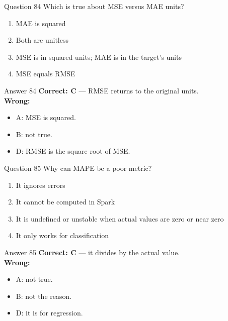 \documentclass[aspectratio=169,11pt]{beamer}
\begin{document}
\begin{frame}{Question 84}
Which is true about MSE versus MAE units?
\begin{enumerate}[label=\Alph*.]
\item MAE is squared
\item Both are unitless
\item MSE is in squared units; MAE is in the target's units
\item MSE equals RMSE
\end{enumerate}
\end{frame}
\begin{frame}{Answer 84}
\textbf{Correct: C} --- RMSE returns to the original units.\\
\vspace{0.5em}
\textbf{Wrong:}
\begin{itemize}
\item A: MSE is squared.
\item B: not true.
\item D: RMSE is the square root of MSE.
\end{itemize}
\end{frame}

\begin{frame}{Question 85}
Why can MAPE be a poor metric?
\begin{enumerate}[label=\Alph*.]
\item It ignores errors
\item It cannot be computed in Spark
\item It is undefined or unstable when actual values are zero or near zero
\item It only works for classification
\end{enumerate}
\end{frame}
\begin{frame}{Answer 85}
\textbf{Correct: C} --- it divides by the actual value.\\
\vspace{0.5em}
\textbf{Wrong:}
\begin{itemize}
\item A: not true.
\item B: not the reason.
\item D: it is for regression.
\end{itemize}
\end{frame}
\end{document}
